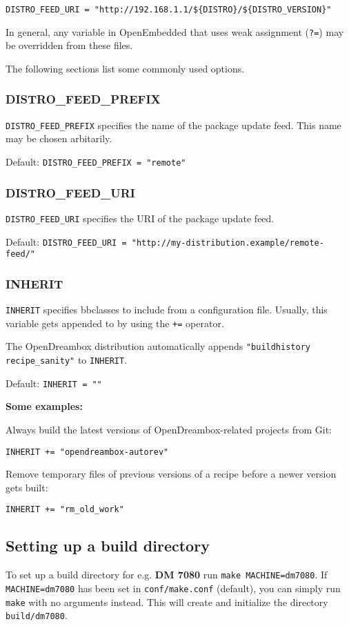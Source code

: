 \documentclass[a4paper]{article}
\newcommand{\shell}[1]{\texttt{\small #1}}
\begin{document}
     \shell{DISTRO\_FEED\_URI = "http://192.168.1.1/\$\{DISTRO\}/\$\{DISTRO\_VERSION\}"}

     In general, any variable in OpenEmbedded that uses weak assignment (\shell{?=}) may be
     overridden from these files.

     The following sections list some commonly used options.

     \subsubsection{DISTRO\_FEED\_PREFIX}

       \shell{DISTRO\_FEED\_PREFIX} specifies the name of the package update feed.
       This name may be chosen arbitarily.

       Default: \shell{DISTRO\_FEED\_PREFIX = "remote"}

     \subsubsection{DISTRO\_FEED\_URI}

       \shell{DISTRO\_FEED\_URI} specifies the URI of the package update feed.

       Default: \shell{DISTRO\_FEED\_URI = "http://my-distribution.example/remote-feed/"}

     \subsubsection{INHERIT}

       \shell{INHERIT} specifies bbclasses to include from a configuration file. Usually,
       this variable gets appended to by using the \shell{+=} operator.

       The OpenDreambox distribution automatically appends \shell{"buildhistory recipe\_sanity"} to \shell{INHERIT}.

       Default: \shell{INHERIT = ""}

       \textbf{Some examples:}

       Always build the latest versions of OpenDreambox-related projects from Git:

       \shell{INHERIT += "opendreambox-autorev"}

       Remove temporary files of previous versions of a recipe before a newer version gets built:

       \shell{INHERIT += "rm\_old\_work"}

  \subsection{Setting up a build directory}
     To set up a build directory for e.g. \textbf{DM 7080} run \shell{make MACHINE=dm7080}. If
     \shell{MACHINE=dm7080} has been set in \shell{conf/make.conf} (default), you can simply run \shell{make}
     with no arguments instead. This will create and initialize the directory \shell{build/dm7080}.
\end{document}
